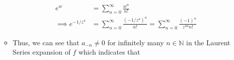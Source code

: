 \documentclass[10pt,a4paper]{article}
\theoremstyle{definition}
\begin{document}
\begin{enumerate}[label = (\alph*)]
\begin{itemize}
	\begin{align*}
	e^w &= \sum_{n = 0}^{\infty} \frac{w^n}{n!}\\
	\implies e^{-1/z^4} &= \sum_{n = 0}^{\infty} \frac{(-1/z^4)^n}{n!} = \sum_{n =0}^{\infty} \frac{(-1)^n}{z^{4n}n!}
	\end{align*}
	\item Thus, we can see that $a_{-n} \neq 0$ for infinitely many $n \in \mathbb{N}$ in the Laurent Series expansion of $f$ which indicates that 
	\end{itemize}
\end{enumerate}
\end{document}
